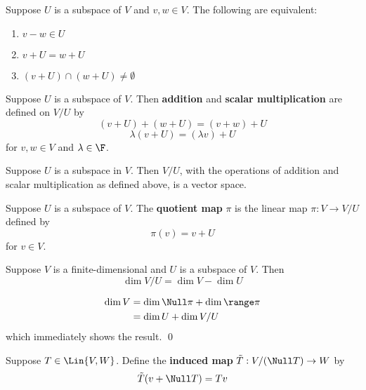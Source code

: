 \begin{theorem}
   Suppose $U$ is a subspace of $V$ and $v, w \in V$. The following are equivalent:
   \begin{enumerate}
      \item $v - w \in U$
      \item $v + U = w + U$
      \item $(v + U) \cap (w + U) \neq \emptyset$
   \end{enumerate}
\end{theorem}

\begin{definition} 
   Suppose $U$ is a subspace of $V$. Then \textbf{addition} and
   \textbf{scalar multiplication} are defined on $V / U$ by
   \[ (v + U) + (w + U) = (v + w) + U \]
   \[ \lambda(v + U) = (\lambda v) + U \]
   for $v, w \in V$ and $\lambda \in \F$.
\end{definition}

\begin{theorem} 
   Suppose $U$ is a subspace in $V$. Then $V/U$, with the operations
   of addition and scalar multiplication as defined above,
   is a vector space.
\end{theorem}

\begin{definition} 
   Suppose $U$ is a subspace of $V$. The \textbf{quotient map} $\pi$
   is the linear map $\pi : V \to V/U$ defined by
   \[ \pi(v) = v + U \]
   for $v \in V$.
\end{definition}

\begin{theorem} 
   Suppose $V$ is a finite-dimensional and $U$ is a subspace of $V$. Then
   \[ \dim V/U = \dim V - \dim U \]

   \begin{proof*}
      \begin{align*}
         \dim V &= \dim \Null \pi + \dim \range \pi \\
         &= \dim U + \dim V/U
      \end{align*}
      which immediately shows the result. \qed
   \end{proof*}
\end{theorem}

\begin{definition} 
   Suppose $T \in \Lin{V, W}$. Define the \textbf{induced map} $\tilde{T} : V / (\Null T) \to W$ by
   \[ \tilde{T}(v + \Null T) = Tv \]
\end{definition}

